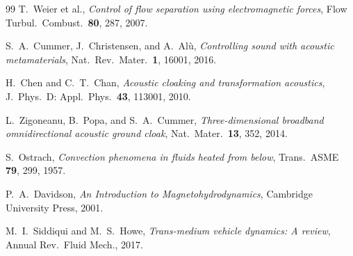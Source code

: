 \documentclass[12pt,twocolumn]{article}
\begin{document}
\begin{thebibliography}{99}
T.~Weier et al., \emph{Control of flow separation using
electromagnetic forces}, Flow Turbul.~Combust.~\textbf{80}, 287, 2007.

S.~A.~Cummer, J.~Christensen, and A.~Al\`{u}, \emph{Controlling sound
with acoustic metamaterials}, Nat.~Rev.~Mater.~\textbf{1}, 16001, 2016.

H.~Chen and C.~T.~Chan, \emph{Acoustic cloaking and transformation
acoustics}, J.~Phys.~D: Appl.~Phys.~\textbf{43}, 113001, 2010.

L.~Zigoneanu, B.~Popa, and S.~A.~Cummer, \emph{Three-dimensional
broadband omnidirectional acoustic ground cloak},
Nat.~Mater.~\textbf{13}, 352, 2014.

S.~Ostrach, \emph{Convection phenomena in fluids heated from below},
Trans.~ASME \textbf{79}, 299, 1957.

P.~A.~Davidson, \emph{An Introduction to Magnetohydrodynamics},
Cambridge University Press, 2001.

M.~I.~Siddiqui and M.~S.~Howe, \emph{Trans-medium vehicle dynamics:
A review}, Annual Rev.~Fluid Mech., 2017.
\end{thebibliography}
\end{document}
